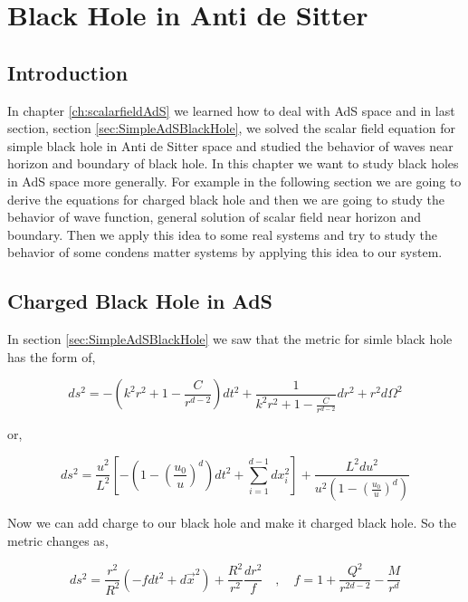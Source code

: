 \chapter{Black Hole in Anti de Sitter}
\label{ch:AdSBlackHole}

\section{Introduction}

In chapter \ref{ch:scalarfieldAdS} we learned how to deal with AdS space and in last section, section \ref{sec:SimpleAdSBlackHole}, we solved the scalar field equation for simple black hole in Anti de Sitter space and studied the behavior of waves near horizon and boundary of black hole. In this chapter we want to study black holes in AdS space more generally. For example in the following section we are going to derive the equations for charged black hole and then we are going to study the behavior of wave function, general solution of scalar field near horizon and boundary. Then we apply this idea to some real systems and try to study the behavior of some condens matter systems by applying this idea to our system.\\

\section{Charged Black Hole in AdS}

In section \ref{sec:SimpleAdSBlackHole} we saw that the metric for simle black hole has the form of,

\begin{equation}
    ds^2 = - \left( k^2r^2 + 1 - \frac{C}{r^{d-2}} \right)dt^2 + \frac{1}{k^2r^2 + 1 - \frac{C}{r^{d-2}}}dr^2 + r^2 d\Omega^2
\end{equation}

or,

\begin{equation}
    ds^2 = \frac{u^2}{L^2} \left[ -(1-(\frac{u_0}{u})^d) dt^2 + \sum\limits_{i=1}^{d-1} dx_i^2 \right] + \frac{L^2 du^2}{u^2 (1-(\frac{u_0}{u})^d)}
\end{equation}

Now we can add charge to our black hole and make it charged black hole. So the metric changes as,

\begin{equation} \label{eq:ChargedBlackHoleAdSMetric}
    ds^2 = \frac{r^2}{R^2}(-fdt^2 + d\vec{x}^2) + \frac{R^2}{r^2}\frac{dr^2}{f} \quad , \quad f = 1+\frac{Q^2}{r^{2d-2}}-\frac{M}{r^d}
\end{equation}


